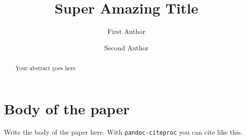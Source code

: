 \documentclass[3p]{elsarticle/elsarticle}
\begin{document}
\begin{frontmatter}

\title{Super Amazing Title}



\author[Group1]{First Author}



\author[Group2]{Second Author}



\address[Group1]{Department of this thing, some university, some country}
\address[Group2]{Department of that thing, some university, some country}



\begin{abstract}
Your abstract goes here
\end{abstract}

\begin{keyword}

\end{keyword}

\end{frontmatter}


\section{Body of the paper}\label{body-of-the-paper}

Write the body of the paper here. With \texttt{pandoc-citeproc} you can cite like
this\citep{jith_crossing_2013}.

\renewcommand\refname{References}

\end{document}
